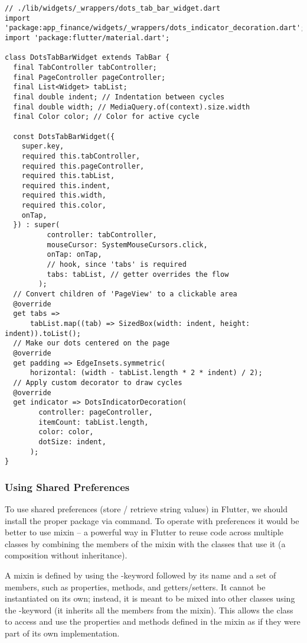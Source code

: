 \begin{lstlisting}
// ./lib/widgets/_wrappers/dots_tab_bar_widget.dart
import 'package:app_finance/widgets/_wrappers/dots_indicator_decoration.dart';
import 'package:flutter/material.dart';

class DotsTabBarWidget extends TabBar {
  final TabController tabController;
  final PageController pageController;
  final List<Widget> tabList;
  final double indent; // Indentation between cycles
  final double width; // MediaQuery.of(context).size.width
  final Color color; // Color for active cycle

  const DotsTabBarWidget({
    super.key,
    required this.tabController,
    required this.pageController,
    required this.tabList,
    required this.indent,
    required this.width,
    required this.color,
    onTap,
  }) : super(
          controller: tabController,
          mouseCursor: SystemMouseCursors.click,
          onTap: onTap,
          // hook, since 'tabs' is required
          tabs: tabList, // getter overrides the flow
        );
  // Convert children of 'PageView' to a clickable area 
  @override
  get tabs =>
      tabList.map((tab) => SizedBox(width: indent, height: indent)).toList();
  // Make our dots centered on the page
  @override
  get padding => EdgeInsets.symmetric(
      horizontal: (width - tabList.length * 2 * indent) / 2);
  // Apply custom decorator to draw cycles
  @override
  get indicator => DotsIndicatorDecoration(
        controller: pageController,
        itemCount: tabList.length,
        color: color,
        dotSize: indent,
      );
}
\end{lstlisting}

\subsubsection{Using Shared Preferences}

To use shared preferences (store / retrieve string values) in Flutter, we should install the proper package via
 command. To operate with preferences it would be better to use mixin --
a powerful way in Flutter to reuse code across multiple classes by combining the members of the mixin with the 
classes that use it (a composition without inheritance).

A mixin is defined by using the -keyword followed by its name and a set of members, such as properties, methods, 
and getters/setters. It cannot be instantiated on its own; instead, it is meant to be mixed into other classes 
using the -keyword (it inherits all the members from the mixin). This allows the class to access and use the 
properties and methods defined in the mixin as if they were part of its own implementation.

